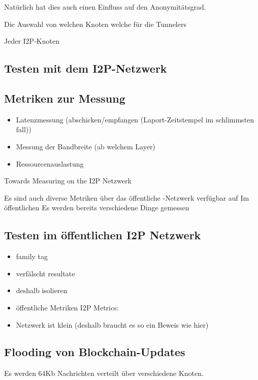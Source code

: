 Natürlich hat dies auch einen Einfluss auf den Anonymitätsgrad.
\parencite[S.~4-5]{timpanaro_monitoring_nodate}

Die Auswahl von welchen Knoten welche für die Tunnelers

Jeder I2P-Knoten


\subsection{Testen mit dem I2P-Netzwerk}

\subsection{Metriken zur Messung}

\begin{itemize}
    \item Latenzmessung (abschicken/empfangen (Laport-Zeitstempel im schlimmsten fall))
    \item Messung der Bandbreite (ab welchem Layer)
    \item Ressourcenauslastung
\end{itemize}

Towards Measuring on the I2P Netzwerk
\cite{wang_towards_2013}


Es sind auch diverse Metriken über das öffentliche -Netzwerk verfügbar auf
Im öffentlichen  Es werden bereits verschiedene Dinge gemessen


\cite{timpanaro_monitoring_nodate}

\subsection{Testen im öffentlichen I2P Netzwerk}

\begin{itemize}
    \item family tag \cite{noauthor_family_nodate}
    \item verfälscht resultate
    \item deshalb isolieren
    \item öffentliche Metriken  I2P Metrics: \cite{noauthor_i2p_nodate-4}
    \item Netzwerk ist klein (deshalb braucht es so ein Beweis wie hier)
\end{itemize}

\subsection{Flooding von Blockchain-Updates}

Es werden 64Kb Nachrichten verteilt über verschiedene Knoten.
